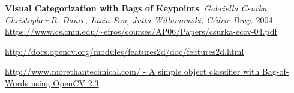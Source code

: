 \documentclass[a4paper,12pt]{article}
\begin{document}

\newpage
\begin{thebibliography}{99}

 \textbf{Visual Categorization with Bags of Keypoints}. 
 \emph{Gabriella Csurka, Christopher R. Dance, Lixin Fan, Jutta Willamowski, Cédric Bray.}
 2004 \url{https://www.cs.cmu.edu/~efros/courses/AP06/Papers/csurka-eccv-04.pdf}

 \url{http://docs.opencv.org/modules/features2d/doc/features2d.html}

 \href{http://www.morethantechnical.com/2011/08/25/a-simple-object-classifier-with-bag-of-words-using-opencv-2-3-w-code/}
{http://www.morethantechnical.com/ - A simple object classifier with Bag-of-Words using OpenCV 2.3}

\end{thebibliography}
\end{document}
